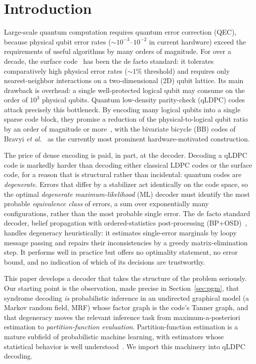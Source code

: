 \documentclass[a4paper,11pt]{quantumarticle}
\theoremstyle{definition}
\begin{document}
\maketitle

\section{Introduction}
\label{sec:intro}
Large-scale quantum computation requires quantum error correction (QEC),
because physical qubit error rates ($\sim 10^{-3}$--$10^{-2}$ in current
hardware) exceed the requirements of useful algorithms by many orders of
magnitude. For over a decade, the surface code~\cite{kitaev2003, dennis2002,
fowler2012} has been the de facto standard: it tolerates comparatively high
physical error rates ($\sim 1\%$ threshold) and requires only nearest-neighbor
interactions on a two-dimensional (2D) qubit lattice. Its main drawback is
overhead: a single well-protected logical qubit may consume on the order of
$10^3$ physical qubits. Quantum low-density parity-check (qLDPC) codes attack
precisely this bottleneck. By encoding many logical qubits into a single
sparse code block, they promise a reduction of the physical-to-logical qubit
ratio by an order of magnitude or more~\cite{gottesman2014, breuckmann2021,
panteleev2022good, leverrier2022}, with the bivariate bicycle (BB) codes of
Bravyi \emph{et al.}~\cite{bravyi2024} as the currently most prominent
hardware-motivated construction.

The price of dense encoding is paid, in part, at the decoder.
Decoding a qLDPC code is markedly harder than decoding either classical LDPC
codes or the surface code, for a reason that is structural rather than
incidental: quantum codes are \emph{degenerate}. Errors that differ by a
stabilizer act identically on the code space, so the optimal
\emph{degenerate maximum-likelihood} (ML) decoder must identify the most
probable \emph{equivalence class} of errors, a sum over exponentially many
configurations, rather than the most probable single error. The de facto
standard decoder, belief propagation with ordered-statistics post-processing
(BP+OSD)~\cite{panteleev2021bposd, roffe2020}, handles degeneracy
heuristically: it estimates single-error marginals by loopy message passing
and repairs their inconsistencies by a greedy matrix-elimination step. It
performs well in practice but offers no optimality statement, no error bound,
and no indication of which of its decisions are trustworthy.

This paper develops a decoder that takes the structure of the problem
seriously. Our starting point is the observation, made precise in
Section~\ref{sec:pgm}, that syndrome decoding \emph{is} probabilistic
inference in an undirected graphical model (a Markov random field, MRF)
whose factor graph is the code's Tanner graph, and that degeneracy moves the
relevant inference task from maximum-a-posteriori estimation to
\emph{partition-function evaluation}. Partition-function estimation is a
mature subfield of probabilistic machine learning, with estimators whose
statistical behavior is well understood~\cite{neal2001, ermon2013,
wainwright2008}. We import this machinery into qLDPC decoding.
\end{document}
